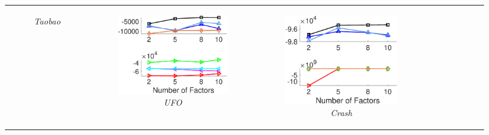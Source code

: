 \begin{figure}
\begin{tabular}[c]{cccc}
\begin{subfigure}[t]{0.25\textwidth}
			\caption{\textit{Taobao}}
		\end{subfigure} 
		&
		\begin{subfigure}[t]{0.25\textwidth}
			\centering
			\includegraphics[width=\textwidth]{./figs/ufo_ll.eps}
			\caption{\textit{UFO}}
		\end{subfigure}
		&
		\begin{subfigure}[t]{0.25\textwidth}
			\centering
			\includegraphics[width=\textwidth]{./figs/crash_ll.eps}
			\caption{\textit{Crash}}
		\end{subfigure} 
		&
		\begin{subfigure}[t]{0.25\textwidth}
			\centering

\end{subfigure}
\end{tabular}
\end{figure}
